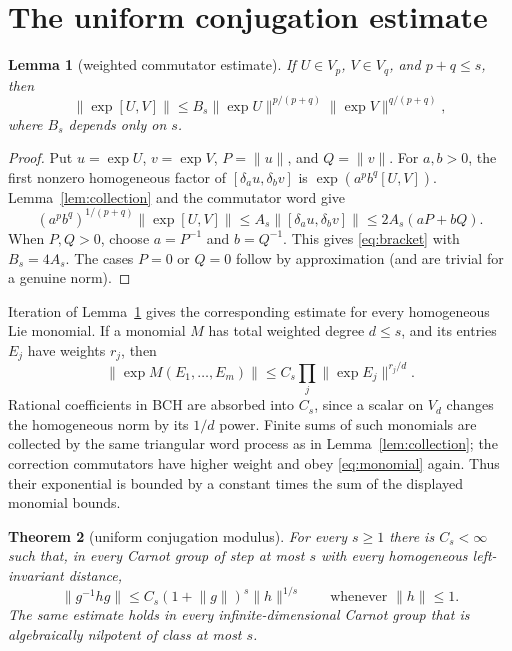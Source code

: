 \documentclass[10pt]{article}
\newtheorem{theorem}{Theorem}
\newtheorem{lemma}[theorem]{Lemma}
\newcommand{\norm}[1]{\lVert #1\rVert}
\begin{document}
\section*{The uniform conjugation estimate}

\begin{lemma}[weighted commutator estimate]\label{lem:bracket}
If $U\in V_p$, $V\in V_q$, and $p+q\leq s$, then
\begin{equation}\label{eq:bracket}
 \norm{\exp[U,V]}
 \leq B_s
 \norm{\exp U}^{p/(p+q)}
 \norm{\exp V}^{q/(p+q)},
\end{equation}
where $B_s$ depends only on $s$.
\end{lemma}

\begin{proof}
Put $u=\exp U$, $v=\exp V$, $P=\norm u$, and $Q=\norm v$.
For $a,b>0$, the first nonzero homogeneous factor of
$[\delta_a u,\delta_bv]$ is
$\exp(a^pb^q[U,V])$.  Lemma~\ref{lem:collection} and the commutator word give
\[
 (a^pb^q)^{1/(p+q)}\norm{\exp[U,V]}
 \leq A_s\norm{[\delta_a u,\delta_bv]}
 \leq2A_s(aP+bQ).
\]
When $P,Q>0$, choose $a=P^{-1}$ and $b=Q^{-1}$.  This gives
\eqref{eq:bracket} with $B_s=4A_s$.  The cases $P=0$ or $Q=0$ follow by
approximation (and are trivial for a genuine norm).
\end{proof}

Iteration of Lemma~\ref{lem:bracket} gives the corresponding estimate for
every homogeneous Lie monomial.  If a monomial $M$ has total weighted degree
$d\leq s$, and its entries $E_j$ have weights $r_j$, then
\begin{equation}\label{eq:monomial}
 \norm{\exp M(E_1,\ldots,E_m)}
 \leq C_s\prod_j\norm{\exp E_j}^{r_j/d}.
\end{equation}
Rational coefficients in BCH are absorbed into $C_s$, since a scalar on
$V_d$ changes the homogeneous norm by its $1/d$ power.  Finite sums of such
monomials are collected by the same triangular word process as in
Lemma~\ref{lem:collection}; the correction commutators have higher weight and
obey \eqref{eq:monomial} again.  Thus their exponential is bounded by a
constant times the sum of the displayed monomial bounds.

\begin{theorem}[uniform conjugation modulus]\label{thm:conj}
For every $s\geq1$ there is $C_s<\infty$ such that, in every Carnot group of
step at most $s$ with every homogeneous left-invariant distance,
\begin{equation}\label{eq:conj}
 \norm{g^{-1}hg}
 \leq C_s(1+\norm g)^s\norm h^{1/s}
 \qquad\text{whenever }\norm h\leq1.
\end{equation}
The same estimate holds in every infinite-dimensional Carnot group that is
algebraically nilpotent of class at most $s$.
\end{theorem}
\end{document}
